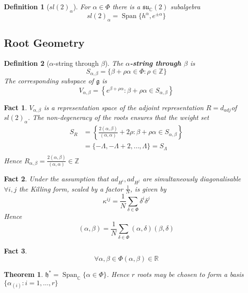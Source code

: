 \documentclass{article}
\newtheorem{theorem}{Theorem}[subsection]
\newtheorem{definition}{Definition}[subsection]
\newtheorem{fact}{Fact}[subsection]
\DeclareMathOperator{\spn}{Span}
\newcommand{\bam}[1]{\textbf{#1}}
\newcommand{\mf}[1]{\mathfrak{#1}}
\newcommand{\mbb}[1]{\mathbb{#1}}
\begin{document}
\begin{definition}[$sl(2)_\alpha$]
For $\alpha\in\Phi$ there is a $\mf{su}_\mbb{C}(2)$ subalgebra 
\[
sl(2)_\alpha=\spn\lbrace h^\alpha, e^{\pm\alpha}\rbrace
\]
\end{definition}


\subsection{Root Geometry}

\begin{definition}[$\alpha$-string through $\beta$]
The \bam{$\alpha$-string through $\beta$} is 
\[
S_{\alpha, \beta}=\lbrace \beta+\rho\alpha\in\Phi : \rho\in\mbb{Z} \rbrace
\]
The corresponding subspace of $\mf{g}$ is 
\[
V_{\alpha, \beta}=\left\{ e^{\beta+\rho\alpha} : \beta+\rho\alpha\in S_{\alpha, \beta} \right\}
\]
\end{definition}
\begin{fact}
$V_{\alpha, \beta}$ is a representation space of the adjoint representation $R=d_{adj}$of $sl(2)_\alpha$. The non-degeneracy of the roots ensures that the weight set 
\begin{align*}
    S_R &= \left\{ \frac{2(\alpha,\beta)}{(\alpha,\alpha)}+2\rho : \beta+\rho\alpha\in S_{\alpha, \beta} \right\} \\
     &= \lbrace -\Lambda,-\Lambda+2,\dots,\Lambda\rbrace=S_\Lambda \\
\end{align*}
Hence $R_{\alpha,\beta}=\frac{2(\alpha,\beta)}{(\alpha,\alpha)} \in\mbb{Z}$
\end{fact}

\begin{fact}
Under the assumption that $ad_{H^i}, ad_{H^j}$ are simultaneously diagonalisable $\forall i,j$ the Killing form, scaled by a factor $\frac{1}{N}$, is given by 
\[
\kappa^{ij}=\frac{1}{N} \sum_{\delta\in\Phi} \delta^i\delta^j
\]
Hence 
\[
(\alpha, \beta)= \frac{1}{N}\sum_{\delta\in\Phi} (\alpha, \delta) (\beta, \delta)
\]
\end{fact}

\begin{fact}
\[
\forall \alpha, \beta\in\Phi (\alpha, \beta)\in\mbb{R}
\]
\end{fact}

\begin{theorem}
$\mf{h}^\ast=\spn_\mbb{C}\lbrace \alpha\in\Phi \rbrace$. Hence $r$ roots may be chosen to form a basis $\lbrace \alpha_{(i)} : i=1,\dots,r \rbrace$
\end{theorem}
\end{document}
